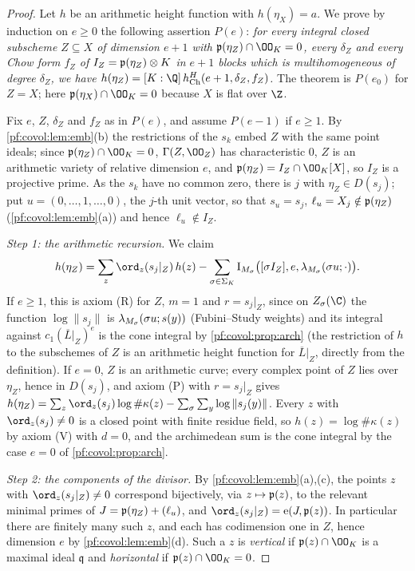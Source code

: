 \begin{proof}
Let $h$ be an arithmetic height function with $h(\eta_X)=a$. We prove by induction on $e\ge0$ the
following assertion $P(e)$: \emph{for every integral closed subscheme $Z\subseteq X$ of dimension $e+1$
with $\covolPt(\eta_Z)\cap\OO_K=0$, every $\delta_Z$ and every Chow form $f_Z$ of
$I_Z=\mathfrak{p}(\eta_Z)\otimes K$ in $e+1$ blocks which is multihomogeneous of degree $\delta_Z$, we have
$h(\eta_Z)=[K:\Q]\,\covolHch^H(e+1,\delta_Z,f_Z)$.} The theorem is $P(e_0)$ for $Z=X$; here
$\covolPt(\eta_X)\cap\OO_K=0$ because $X$ is flat over $\Z$.

Fix $e$, $Z$, $\delta_Z$ and $f_Z$ as in $P(e)$, and assume $P(e-1)$ if $e\ge1$. By
\cref{pf:covol:lem:emb}(b) the restrictions of the $s_k$ embed $Z$ with the same point ideals; since
$\covolPt(\eta_Z)\cap\OO_K=0$, $\Gamma(Z,\OO_Z)$ has characteristic $0$, $Z$ is an arithmetic variety of
relative dimension $e$, and $\covolPt(\eta_Z)=I_Z\cap\OO_K[X]$, so $I_Z$ is a projective prime. As the
$s_k$ have no common zero, there is $j$ with $\eta_Z\in D(s_j)$; put $u=(0,\dots,1,\dots,0)$, the $j$-th
unit vector, so that $s_u=s_j$, $\ell_u=X_j\notin\mathfrak{p}(\eta_Z)$ (\cref{pf:covol:lem:emb}(a)) and hence
$\ell_u\notin I_Z$.

\emph{Step 1: the arithmetic recursion.} We claim
\begin{equation}\label{pf:covol:eq:step}
h(\eta_Z)=\sum_z\ord_z(s_j|_Z)\,h(z)-\sum_{\sigma\in\Sigma_K}\covolCyc_{M_\sigma}\bigl([\sigma I_Z],e,
\covolFs_{M_\sigma}(\sigma u;\cdot)\bigr).
\end{equation}
If $e\ge1$, this is axiom (R) for $Z$, $m=1$ and $r=s_j|_Z$, since on $Z_\sigma(\C)$ the function
$\log\|s_j\|$ is $\lambda_{M_\sigma}(\sigma u;s(y))$ (Fubini--Study weights) and its integral against
$c_1(\overline L|_Z)^e$ is the cone integral by \cref{pf:covol:prop:arch} (the restriction of $h$ to
the subschemes of $Z$ is an arithmetic height function for $\overline L|_Z$, directly from the
definition). If $e=0$, $Z$ is an arithmetic curve; every complex
point of $Z$ lies over $\eta_Z$, hence in $D(s_j)$, and axiom (P) with $r=s_j|_Z$ gives
$h(\eta_Z)=\sum_z\ord_z(s_j)\log\#\kappa(z)-\sum_\sigma\sum_y\log\|s_j(y)\|$. Every $z$ with
$\ord_z(s_j)\ne0$ is a closed point with finite residue field, so $h(z)=\log\#\kappa(z)$ by axiom (V)
with $d=0$, and the archimedean sum is the cone integral by the case $e=0$ of
\cref{pf:covol:prop:arch}.

\emph{Step 2: the components of the divisor.} By \cref{pf:covol:lem:emb}(a),(c), the points $z$ with
$\ord_z(s_j|_Z)\ne0$ correspond bijectively, via $z\mapsto\mathfrak{p}(z)$, to the relevant minimal primes of
$J=\mathfrak{p}(\eta_Z)+(\ell_u)$, and $\ord_z(s_j|_Z)=\covolLm(J,\covolPt(z))$. In particular there are
finitely many such $z$, and each has codimension one in $Z$, hence dimension $e$ by
\cref{pf:covol:lem:emb}(d). Such a $z$ is \emph{vertical} if $\covolPt(z)\cap\OO_K$ is a maximal ideal
$\mathfrak q$ and \emph{horizontal} if $\covolPt(z)\cap\OO_K=0$.


\end{proof}
